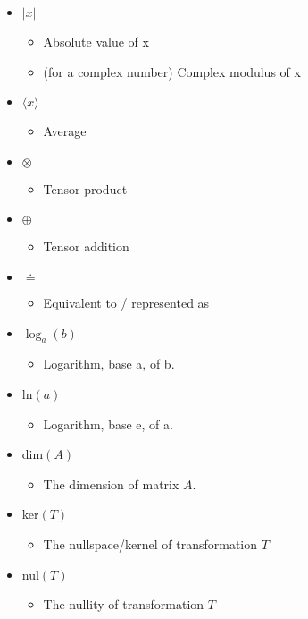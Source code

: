 \begin{itemize}
\item $|x|$
\begin{itemize}
\item Absolute value of x
\item (for a complex number) Complex modulus of x
\end{itemize}

\item $\langle x\rangle$
\begin{itemize}
\item Average
\end{itemize}

\item $\otimes$
\begin{itemize}
\item Tensor product
\end{itemize}

\item $\oplus$
\begin{itemize}
\item Tensor addition
\end{itemize}

\item $\doteq$
\begin{itemize}
\item Equivalent to / represented as
\end{itemize}

\item $\log_a(b)$
\begin{itemize}
\item Logarithm, base a, of b.
\end{itemize}

\item ln$(a)$
\begin{itemize}
\item Logarithm, base e, of a.
\end{itemize}

\item dim$(A)$
\begin{itemize}
\item The dimension of matrix $A$.
\end{itemize}

\item ker$(T)$
\begin{itemize}
\item The nullspace/kernel of transformation $T$
\end{itemize}

\item nul$(T)$
\begin{itemize}
\item The nullity of transformation $T$
\end{itemize}


\end{itemize}
